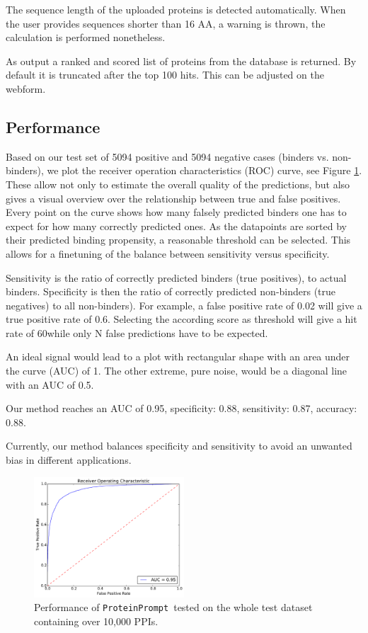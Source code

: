\documentclass[3p,times,twocolumn]{elsarticle}
\newcommand{\TODO}[1] {\begingroup\color{red}#1\endgroup}
\newcommand{\tool}{\texttt{ProteinPrompt}}
\begin{document}
The sequence length of the uploaded proteins is detected automatically. When the user provides
sequences shorter than 16 AA, a warning is thrown,
the calculation is performed nonetheless.

As output a ranked and scored list of proteins from the database is
returned. By default it is truncated after the top 100 
hits. This can be adjusted on the webform. 


\subsection{Performance}
\label{performance}

Based on our test set of 5094 positive and 5094 negative cases
(binders vs. non-binders), we plot the receiver operation
characteristics (ROC) curve, see Figure \ref{fig:roc}.
These allow not only to estimate the overall quality of the predictions, but also
gives a visual overview over the relationship between true and false
positives.
Every point on the curve shows how many falsely predicted binders one has to expect for how many correctly predicted ones.
As the datapoints are sorted by their predicted binding propensity, a reasonable threshold can be selected.
This allows for a finetuning of the balance between sensitivity versus specificity.

\TODO{ Sensitivity is the ratio of correctly predicted binders (true positives), to actual binders.
  Specificity is then the ratio of correctly predicted non-binders (true negatives) to all non-binders).
  For example, a false positive rate of 0.02 will give a true positive rate of 0.6.
  Selecting the according score as threshold will give a hit rate of 60\perc while only N false predictions have to be expected.
}

An ideal signal would lead to a plot with rectangular shape
with an area under the curve (AUC) of 1. The other extreme, pure noise, would be a diagonal
line with an AUC of 0.5.

Our method reaches an AUC of 0.95,
specificity: 0.88,
sensitivity: 0.87,
accuracy: 0.88.

Currently, our method balances specificity and sensitivity to avoid an
unwanted bias in different applications.

\begin{figure}[t]
\includegraphics[width=0.5\textwidth]{img/meta_final_roc.pdf}
\caption{Performance of \tool\  tested on the whole test dataset
  containing over 10,000 PPIs.}
\label{fig:roc}
\end{figure} 
\end{document}
